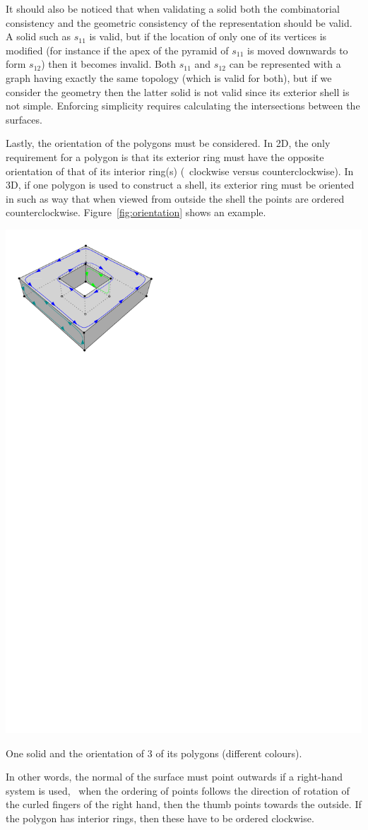 It should also be noticed that when validating a solid both the combinatorial consistency and the geometric consistency of the representation should be valid.
A solid such as $s_{11}$ is valid, but if the location of only one of its vertices is modified (for instance if the apex of the pyramid of $s_{11}$ is moved downwards to form $s_{12}$) then it becomes invalid. 
Both $s_{11}$ and $s_{12}$ can be represented with a graph having exactly the same topology (which is valid for both), but if we consider the geometry then the latter solid is not valid since its exterior shell is not simple.
Enforcing simplicity requires calculating the intersections between the surfaces.

Lastly, the orientation of the polygons must be considered.
In 2D, the only requirement for a polygon is that its exterior ring must have the opposite orientation of that of its interior ring(s) (\eg\ clockwise versus counterclockwise).
In 3D, if one polygon is used to construct a shell, its exterior ring must be oriented in such as way that when viewed from outside the shell the points are ordered counterclockwise.
Figure~\ref{fig:orientation} shows an example.
\begin{marginfigure}
  \centering
  \includegraphics[width=0.8\linewidth]{figs/orientation.pdf}
  \caption{One solid and the orientation of 3 of its polygons (different colours).}%
\label{fig:orientation}
\end{marginfigure}
In other words, the normal of the surface must point outwards if a right-hand system is used, \ie\ when the ordering of points follows the direction of rotation of the curled fingers of the right hand, then the thumb points towards the outside.
If the polygon has interior rings, then these have to be ordered clockwise.


